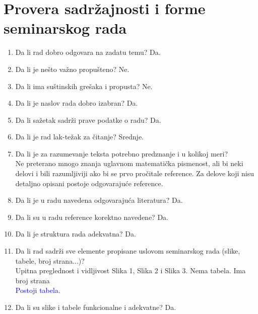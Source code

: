 \documentclass[a4paper]{report}
\newcommand{\odgovor}[1]{\textcolor{blue}{#1}}
\begin{document}
\section{Provera sadržajnosti i forme seminarskog rada}

\begin{enumerate}
\item Da li rad dobro odgovara na zadatu temu? Da.\\
\item Da li je nešto važno propušteno? Ne.\\
\item Da li ima suštinskih grešaka i propusta? Ne.\\
\item Da li je naslov rada dobro izabran? Da.\\
\item Da li sažetak sadrži prave podatke o radu?  Da.\\
\item Da li je rad lak-težak za čitanje?  Srednje.\\
\item Da li je za razumevanje teksta potrebno predznanje i u kolikoj meri?\\ Ne
preterano mnogo znanja uglavnom matematička pismenost, ali bi neki delovi i bili razumljiviji ako bi se prvo pročitale reference. Za
delove koji nisu detaljno opisani postoje odgovarajuće reference.\\
\item Da li je u radu navedena odgovarajuća literatura?  Da.\\
\item Da li su u radu reference korektno navedene?  Da.\\
\item Da li je struktura rada adekvatna?  Da.\\
\item Da li rad sadrži sve elemente propisane uslovom seminarskog rada (slike, tabele, broj strana...)?\\
Upitna preglednost i vidljivost Slika 1, Slika 2 i Slika 3. Nema tabela. Ima broj strana    \\\odgovor{Postoji tabela.} \\
\item Da li su slike i tabele funkcionalne i adekvatne? Da.\\
\end{enumerate}
\end{document}
